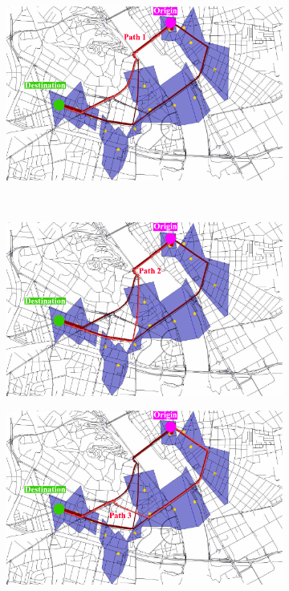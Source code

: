 \documentclass[master,english]{hgbthesis}
\begin{document}
\begin{figure}
	\centering
	\begin{subfigure}[b]{0.5\linewidth}
		\includegraphics[width=\textwidth]{./images/tattipath0}
		\caption{}
		\label{fig:tattipath0}
	\end{subfigure}%
	~
	\begin{subfigure}[b]{0.5\linewidth}
		\includegraphics[width=\textwidth]{./images/tattipath1}
		\caption{}
		\label{fig:tattipath1}
	\end{subfigure}
	\begin{subfigure}[b]{0.5\linewidth}
			\includegraphics[width=\textwidth]{./images/tattipath2}

\end{subfigure}
\end{figure}
\end{document}
